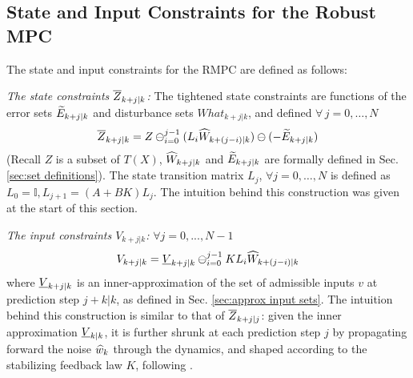 \subsection{State and Input Constraints for the Robust MPC}
\label{sec:Constraints}
The state and input constraints for the RMPC are defined as follows:

\textit{The state constraints $\overline{Z}_{k+j|k}$:}
The tightened state constraints are functions of the error sets $\widetilde{E}_{k+j|k}$ and disturbance sets $What_{k+j|k}$, and defined $\forall\,j=0,\dotsc,N$
{\small{
\begin{equation} 
\label{eq:Set_constraints}
\overline{Z}_{k+j|k} = Z \ominus_{i=0}^{j-1}(L_i \widehat{W}_{k+(j-i)|k})\ominus (-\widetilde{E}_{k+j|k})
\end{equation}
}}
(Recall $Z$ is a subset of $T(X)$, $\widehat{W}_{k+j|k}$ and $\widetilde{E}_{k+j|k}$ are formally defined in Sec. \ref{sec:set definitions}).
The state transition matrix $L_j$, $\forall j=0,\dotsc,N$   is defined as $L_0 = \mathbb{I}, L_{j+1} = (A+BK)L_j $.
The intuition behind this construction was given at the start of this section.

\textit{The input constraints $V_{k+j|k}$:}
$\forall j=0,...,N-1$
\begin{equation} 
\label{eq:input_constraints}
V_{k+j|k} = \underline{V}_{k+j|k} \ominus_{i=0}^{j-1}KL_i\widehat{W}_{k+(j-i)|k} 
\end{equation}
where $\underline{V}_{k+j|k} $ is an inner-approximation of the set of admissible inputs $v$ at prediction step $j+k|k$, as defined in Sec. \ref{sec:approx input sets}.
The intuition behind this construction is similar to that of $\overline{Z}_{k+j|j}$: given the inner approximation $\underline{V}_{k|k} $, it is further shrunk at each prediction step $j$ by propagating forward the noise $\widehat{w}_k$ through the dynamics, and shaped according to the stabilizing feedback law $K$, following \cite{RichardsH05_RMPC}.

